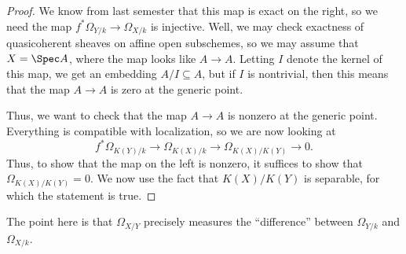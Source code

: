 \documentclass[../notes.tex]{subfiles}
\begin{document}
\begin{proof}
	We know from last semester that this map is exact on the right, so we need the map $f^*\Omega_{Y/k}\to\Omega_{X/k}$ is injective. Well, we may check exactness of quasicoherent sheaves on affine open subschemes, so we may assume that $X=\Spec A$, where the map looks like $A\to A$. Letting $I$ denote the kernel of this map, we get an embedding $A/I\subseteq A$, but if $I$ is nontrivial, then this means that the map $A\to A$ is zero at the generic point.

	Thus, we want to check that the map $A\to A$ is nonzero at the generic point. Everything is compatible with localization, so we are now looking at
	\[f^*\Omega_{K(Y)/k}\to\Omega_{K(X)/k}\to\Omega_{K(X)/K(Y)}\to0.\]
	Thus, to show that the map on the left is nonzero, it suffices to show that $\Omega_{K(X)/K(Y)}=0$. We now use the fact that $K(X)/K(Y)$ is separable, for which the statement is true.\todo{}
\end{proof}
The point here is that $\Omega_{X/Y}$ precisely measures the ``difference'' between $\Omega_{Y/k}$ and $\Omega_{X/k}$.
\end{document}
